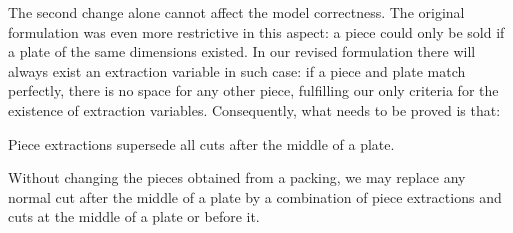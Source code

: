 \documentclass[ppgc,prop-tese,english,formais,babel]{iiufrgs}
\begin{document}
The second change alone cannot affect the model correctness.
The original formulation was even more restrictive in this aspect:
a piece could only be sold if a plate of the same dimensions existed.
In our revised formulation there will always exist an extraction variable in such case:
if a piece and plate match perfectly, there is no space for any other piece, fulfilling our only criteria for the existence of extraction variables.
Consequently, what needs to be proved is that:

\begin{theorem}{Piece extractions supersede all cuts after the middle of a plate.}

Without changing the pieces obtained from a packing, we may replace any normal cut after the middle of a plate by a combination of piece extractions and cuts at the middle of a plate or before it.
\label{the:enhanced_correctness}
\end{theorem}

\end{document}
